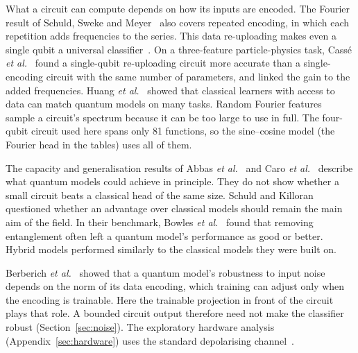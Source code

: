 \documentclass{ieeeaccess}
\begin{document}
What a circuit can compute depends on how its inputs are encoded. The Fourier result of Schuld, Sweke and Meyer~\cite{schuld2021} also covers repeated encoding, in which each repetition adds frequencies to the series. This data re-uploading makes even a single qubit a universal classifier~\cite{perezsalinas2020}. On a three-feature particle-physics task, Cass\'e \emph{et al.}~\cite{casse2024} found a single-qubit re-uploading circuit more accurate than a single-encoding circuit with the same number of parameters, and linked the gain to the added frequencies. Huang \emph{et al.}~\cite{huang2021} showed that classical learners with access to data can match quantum models on many tasks. Random Fourier features~\cite{landman2023,sweke2025} sample a circuit's spectrum because it can be too large to use in full. The four-qubit circuit used here spans only 81 functions, so the sine--cosine model (the Fourier head in the tables) uses all of them.

The capacity and generalisation results of Abbas \emph{et al.}~\cite{abbas2021} and Caro \emph{et al.}~\cite{caro2022} describe what quantum models could achieve in principle. They do not show whether a small circuit beats a classical head of the same size. Schuld and Killoran~\cite{schuld2022} questioned whether an advantage over classical models should remain the main aim of the field. In their benchmark, Bowles \emph{et al.}~\cite{bowles2024} found that removing entanglement often left a quantum model's performance as good or better. Hybrid models performed similarly to the classical models they were built on.

Berberich \emph{et al.}~\cite{berberich2024} showed that a quantum model's robustness to input noise depends on the norm of its data encoding, which training can adjust only when the encoding is trainable. Here the trainable projection in front of the circuit plays that role. A bounded circuit output therefore need not make the classifier robust (Section~\ref{sec:noise}). The exploratory hardware analysis (Appendix~\ref{sec:hardware}) uses the standard depolarising channel~\cite{nielsen2010}.
\end{document}
